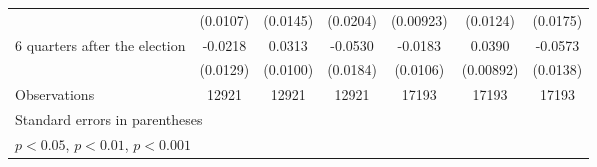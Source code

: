 \begin{table}[htbp]
\begin{tabular}{l*{6}{c}}
                    &    (0.0107)         &    (0.0145)         &    (0.0204)         &   (0.00923)         &    (0.0124)         &    (0.0175)         \\
[1em]
 6 quarters after the election&     -0.0218         &      0.0313\sym{**} &     -0.0530\sym{**} &     -0.0183         &      0.0390\sym{***}&     -0.0573\sym{***}\\
                    &    (0.0129)         &    (0.0100)         &    (0.0184)         &    (0.0106)         &   (0.00892)         &    (0.0138)         \\
\hline
Observations        &       12921         &       12921         &       12921         &       17193         &       17193         &       17193         \\
\hline\hline
\multicolumn{7}{l}{\footnotesize Standard errors in parentheses}\\
\multicolumn{7}{l}{\footnotesize \sym{*} \(p<0.05\), \sym{**} \(p<0.01\), \sym{***} \(p<0.001\)}\\
\end{tabular}
\end{table}
